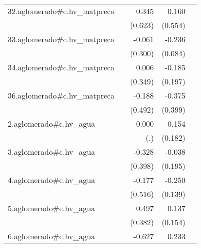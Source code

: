 {\begin{longtable}{l*{4}{D{.}{.}{-1}}}
\addlinespace
32.aglomerado#c.hv\_matpreca&                     &       0.345         &       0.160         &                     \\
            &                     &     (0.623)         &     (0.554)         &                     \\
\addlinespace
33.aglomerado#c.hv\_matpreca&                     &      -0.061         &      -0.236\sym{**} &                     \\
            &                     &     (0.300)         &     (0.084)         &                     \\
\addlinespace
34.aglomerado#c.hv\_matpreca&                     &       0.006         &      -0.185         &                     \\
            &                     &     (0.349)         &     (0.197)         &                     \\
\addlinespace
36.aglomerado#c.hv\_matpreca&                     &      -0.188         &      -0.375         &                     \\
            &                     &     (0.492)         &     (0.399)         &                     \\
\addlinespace
2.aglomerado#c.hv\_agua&                     &       0.000         &       0.154         &                     \\
            &                     &         (.)         &     (0.182)         &                     \\
\addlinespace
3.aglomerado#c.hv\_agua&                     &      -0.328         &      -0.038         &                     \\
            &                     &     (0.398)         &     (0.195)         &                     \\
\addlinespace
4.aglomerado#c.hv\_agua&                     &      -0.177         &      -0.250         &                     \\
            &                     &     (0.516)         &     (0.139)         &                     \\
\addlinespace
5.aglomerado#c.hv\_agua&                     &       0.497         &       0.137         &                     \\
            &                     &     (0.382)         &     (0.154)         &                     \\
\addlinespace
6.aglomerado#c.hv\_agua&                     &      -0.627         &       0.233         &                     \\

\end{longtable}}
